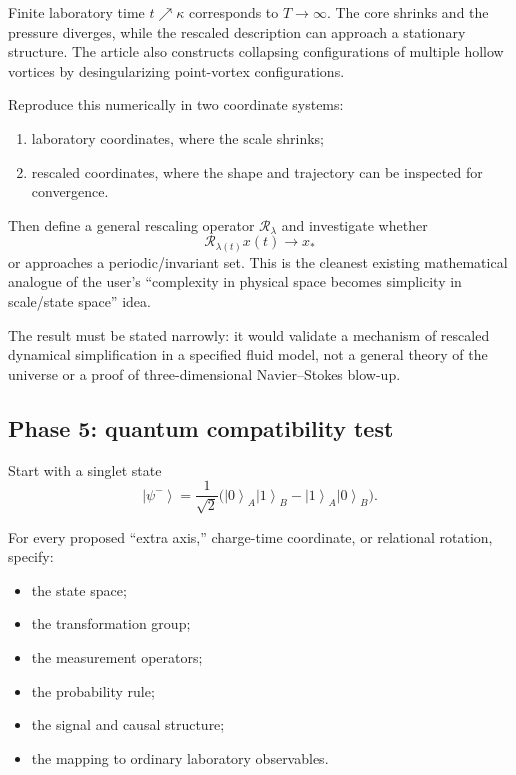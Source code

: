 \documentclass[11pt]{article}
\newcommand{\ket}[1]{\left\lvert #1 \right\rangle}
\newcommand{\Rescale}{\mathcal{R}}
\newcommand{\Scale}{\lambda}
\theoremstyle{definition}
\theoremstyle{plain}
\theoremstyle{remark}
\begin{document}
Finite laboratory time $t\nearrow\kappa$ corresponds to $T\to\infty$. The core shrinks and the pressure diverges, while the rescaled description can approach a stationary structure. The article also constructs collapsing configurations of multiple hollow vortices by desingularizing point-vortex configurations.

Reproduce this numerically in two coordinate systems:
\begin{enumerate}
  \item laboratory coordinates, where the scale shrinks;
  \item rescaled coordinates, where the shape and trajectory can be inspected for convergence.
\end{enumerate}

Then define a general rescaling operator $\Rescale_\Scale$ and investigate whether
\begin{equation}
  \Rescale_{\Scale(t)}x(t)\longrightarrow x_\ast
  \label{eq:general-rescaling}
\end{equation}
or approaches a periodic/invariant set. This is the cleanest existing mathematical analogue of the user's ``complexity in physical space becomes simplicity in scale/state space'' idea.

The result must be stated narrowly: it would validate a mechanism of rescaled dynamical simplification in a specified fluid model, not a general theory of the universe or a proof of three-dimensional Navier--Stokes blow-up.

\subsection{Phase 5: quantum compatibility test}

Start with a singlet state
\begin{equation}
  \ket{\psi^-}
  =\frac{1}{\sqrt{2}}
  \bigl(\ket{0}_A\ket{1}_B-\ket{1}_A\ket{0}_B\bigr).
  \label{eq:singlet}
\end{equation}

For every proposed ``extra axis,'' charge-time coordinate, or relational rotation, specify:
\begin{itemize}
  \item the state space;
  \item the transformation group;
  \item the measurement operators;
  \item the probability rule;
  \item the signal and causal structure;
  \item the mapping to ordinary laboratory observables.
\end{itemize}
\end{document}
